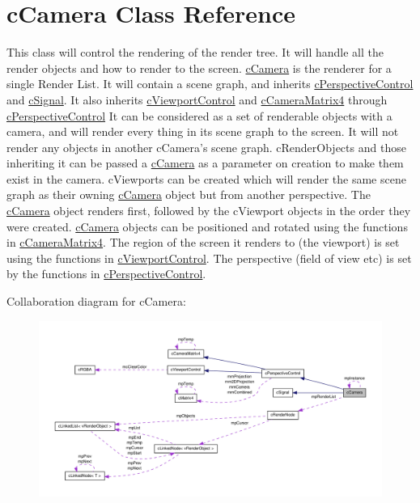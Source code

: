 \hypertarget{classc_camera}{
\section{cCamera Class Reference}
\label{classc_camera}
}


This class will control the rendering of the render tree. It will handle all the render objects and how to render to the screen. \hyperlink{classc_camera}{cCamera} is the renderer for a single Render List. It will contain a scene graph, and inherits \hyperlink{classc_perspective_control}{cPerspectiveControl} and \hyperlink{classc_signal}{cSignal}. It also inherits \hyperlink{classc_viewport_control}{cViewportControl} and \hyperlink{classc_camera_matrix4}{cCameraMatrix4} through \hyperlink{classc_perspective_control}{cPerspectiveControl} It can be considered as a set of renderable objects with a camera, and will render every thing in its scene graph to the screen. It will not render any objects in another cCamera's scene graph. cRenderObjects and those inheriting it can be passed a \hyperlink{classc_camera}{cCamera} as a parameter on creation to make them exist in the camera. cViewports can be created which will render the same scene graph as their owning \hyperlink{classc_camera}{cCamera} object but from another perspective. The \hyperlink{classc_camera}{cCamera} object renders first, followed by the cViewport objects in the order they were created. \hyperlink{classc_camera}{cCamera} objects can be positioned and rotated using the functions in \hyperlink{classc_camera_matrix4}{cCameraMatrix4}. The region of the screen it renders to (the viewport) is set using the functions in \hyperlink{classc_viewport_control}{cViewportControl}. The perspective (field of view etc) is set by the functions in \hyperlink{classc_perspective_control}{cPerspectiveControl}.  




Collaboration diagram for cCamera:
\nopagebreak
\begin{figure}[H]
\begin{center}
\leavevmode
\includegraphics[width=400pt]{classc_camera__coll__graph}
\end{center}
\end{figure}
